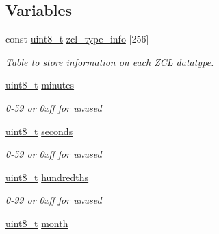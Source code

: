\subsection*{Variables}
\begin{DoxyCompactItemize}
\item 
const \hyperlink{group__hal_gae1affc9ca37cfb624959c866a73f83c2}{uint8\-\_\-t} \hyperlink{group__zcl__types_ga0f5737f60f1f37fb3b375e9fd5fe664d}{zcl\-\_\-type\-\_\-info} \mbox{[}256\mbox{]}
\begin{DoxyCompactList}\small\item\em Table to store information on each Z\-C\-L datatype. \end{DoxyCompactList}\item 
\hypertarget{group__zcl__types_ga7acca8be0094a19be6e308ac05924c4f}{\hyperlink{group__hal_gae1affc9ca37cfb624959c866a73f83c2}{uint8\-\_\-t} \hyperlink{group__zcl__types_ga7acca8be0094a19be6e308ac05924c4f}{minutes}}\label{group__zcl__types_ga7acca8be0094a19be6e308ac05924c4f}

\begin{DoxyCompactList}\small\item\em 0-\/59 or 0xff for unused \end{DoxyCompactList}\item 
\hypertarget{group__zcl__types_ga46729a903be1a03cdb248fb48d84d4f5}{\hyperlink{group__hal_gae1affc9ca37cfb624959c866a73f83c2}{uint8\-\_\-t} \hyperlink{group__zcl__types_ga46729a903be1a03cdb248fb48d84d4f5}{seconds}}\label{group__zcl__types_ga46729a903be1a03cdb248fb48d84d4f5}

\begin{DoxyCompactList}\small\item\em 0-\/59 or 0xff for unused \end{DoxyCompactList}\item 
\hypertarget{group__zcl__types_gaa9acbdd2fcf00f83919be503371fc8a2}{\hyperlink{group__hal_gae1affc9ca37cfb624959c866a73f83c2}{uint8\-\_\-t} \hyperlink{group__zcl__types_gaa9acbdd2fcf00f83919be503371fc8a2}{hundredths}}\label{group__zcl__types_gaa9acbdd2fcf00f83919be503371fc8a2}

\begin{DoxyCompactList}\small\item\em 0-\/99 or 0xff for unused \end{DoxyCompactList}\item 
\hypertarget{group__zcl__types_ga3e00faf7fbf9805e9ec4d2edd6339050}{\hyperlink{group__hal_gae1affc9ca37cfb624959c866a73f83c2}{uint8\-\_\-t} \hyperlink{group__zcl__types_ga3e00faf7fbf9805e9ec4d2edd6339050}{month}}\label{group__zcl__types_ga3e00faf7fbf9805e9ec4d2edd6339050}


\end{DoxyCompactItemize}
